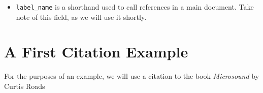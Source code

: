 \documentclass{article}
\begin{document}
\begin{itemize}
    \item \texttt{label_name} is a shorthand used to call references in a main document. Take note of this field, as we will use it shortly.
\end{itemize}

\section{A First Citation Example}

For the purposes of an example, we will use a citation to the book \textit{Microsound} \cite{microsound} by Curtis Roads
\end{document}
